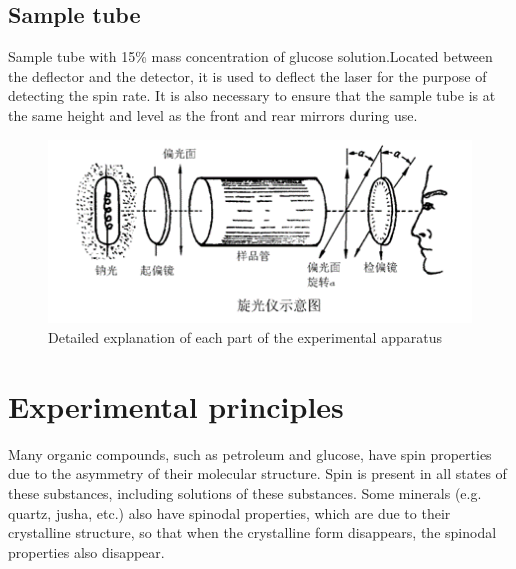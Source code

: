 \documentclass[UTF8]{article}
\begin{document}
	\subsection{Sample tube }
	Sample tube with 15\% mass concentration of glucose solution.Located between the deflector and the detector, it is used to deflect the laser for the purpose of detecting the spin rate. It is also necessary to ensure that the sample tube is at the same height and level as the front and rear mirrors during use.
	  \begin{figure}[H]
	  	\centering
	  	\includegraphics[clip,scale=1,trim={0 22 0 0}]{figure/fig3.png}
	  	\caption{Detailed explanation of each part of the experimental apparatus}
	  	\label{figure.3}
	  \end{figure}
	
	
	
	

	
	\section{Experimental principles}
	Many organic compounds, such as petroleum and glucose, have spin properties due to the asymmetry of their molecular structure. Spin is present in all states of these substances, including solutions of these substances. Some minerals (e.g. quartz, jusha, etc.) also have spinodal properties, which are due to their crystalline structure, so that when the crystalline form disappears, the spinodal properties also disappear.
	
	
\end{document}
